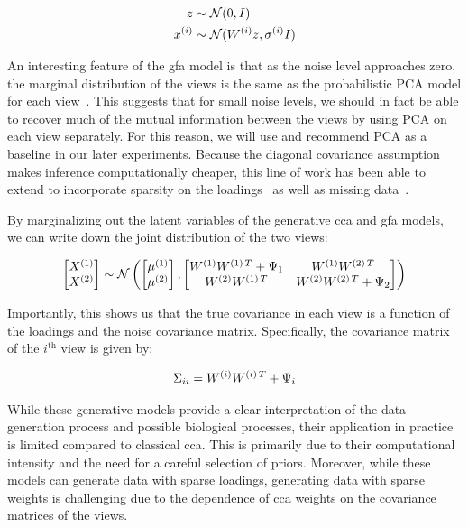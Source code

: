 \begin{align}
    z& \sim \mathcal{N}(0, I)\\
    x^{(i)} & \sim \mathcal{N}(W^{(i)} z, \sigma^{(i)}I)
\end{align}

An interesting feature of the \acrshort{gfa} model is that as the noise level approaches zero, the marginal distribution of the views is the same as the probabilistic PCA model for each view~\citep{tipping1999probabilistic}.
This suggests that for small noise levels, we should in fact be able to recover much of the mutual information between the views by using PCA on each view separately.
For this reason, we will use and recommend PCA as a baseline in our later experiments.
Because the diagonal covariance assumption makes inference computationally cheaper, this line of work has been able to extend to incorporate sparsity on the loadings~\citep{virtanen2011bayesian} as well as missing data~\citep{ferreira2022hierarchical}.

By marginalizing out the latent variables of the generative \acrshort{cca} and \acrshort{gfa} models, we can write down the joint distribution of the two views:

\begin{align}
    \begin{bmatrix}
        X^{(1)} \\ X^{(2)}
    \end{bmatrix} \sim \mathcal{N} \left( \begin{bmatrix}
                                              \mu^{(1)} \\ \mu^{(2)}
    \end{bmatrix}, \begin{bmatrix}
                       W^{(1)}W^{(1)\,T} + \Psi_1 & W^{(1)}W^{(2)\,T} \\ W^{(2)}W^{(1)\,T} & W^{(2)}W^{(2)\,T} + \Psi_2
    \end{bmatrix} \right)
\end{align}

Importantly, this shows us that the true covariance in each view is a function of the \gls{loadings} and the noise covariance matrix.
Specifically, the covariance matrix of the $i^{\text{th}}$ view is given by:

\begin{align}
    \Sigma_{ii} = W^{(i)}W^{(i)\,T} + \Psi_i
\end{align}

While these generative models provide a clear interpretation of the data generation process and possible biological processes, their application in practice is limited compared to classical \acrshort{cca}.
This is primarily due to their computational intensity and the need for a careful selection of priors.
Moreover, while these models can generate data with sparse loadings, generating data with sparse weights is challenging due to the dependence of \acrshort{cca} weights on the covariance matrices of the views.

